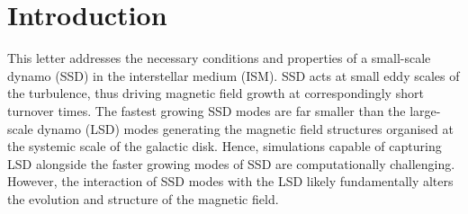 \documentclass[preprint2]{aastex63}
\newcommand{\fag}[1]{\textcolor{midgreen}{FAG: #1}}
\begin{document}
\section{Introduction}\label{sec:intro}


 This letter addresses the necessary conditions and properties of a small-scale
 dynamo (SSD) in the interstellar medium (ISM).
 SSD acts at small eddy scales of the turbulence, thus driving magnetic field
 growth at correspondingly short turnover times.
 The fastest growing SSD modes are far smaller than the large-scale dynamo
 (LSD) modes generating the magnetic field structures organised at the systemic
 scale of the galactic disk.
 Hence, simulations capable of capturing LSD alongside the faster growing modes
 of SSD are computationally challenging.
 However, the interaction of SSD modes with the LSD likely fundamentally alters
 the evolution and structure of the magnetic field.
\end{document}
